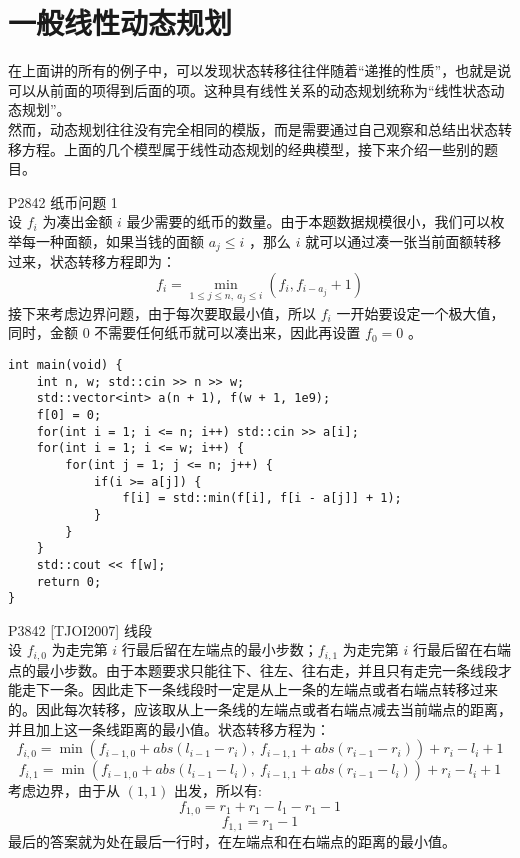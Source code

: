 \documentclass{beamer}
\begin{document}
\section{一般线性动态规划}
\begin{frame}
在上面讲的所有的例子中，可以发现状态转移往往伴随着“递推的性质”，也就是说可以从前面的项得到后面的项。这种具有线性关系的动态规划统称为“线性状态动态规划”。\\ 
然而，动态规划往往没有完全相同的模版，而是需要通过自己观察和总结出状态转移方程。上面的几个模型属于线性动态规划的经典模型，接下来介绍一些别的题目。
\end{frame}
\begin{frame}
P2842 纸币问题 1\\
设 $f_i$ 为凑出金额 $i$ 最少需要的纸币的数量。由于本题数据规模很小，我们可以枚举每一种面额，如果当钱的面额 $a_j \leq i$ ，那么 $i$ 就可以通过凑一张当前面额转移过来，状态转移方程即为：
$$f_i = \min_{1 \leq j \leq n, \ a_j \leq i}(f_i, f_{i - a_j} + 1)$$
接下来考虑边界问题，由于每次要取最小值，所以 $f_i$ 一开始要设定一个极大值，同时，金额 $0$ 不需要任何纸币就可以凑出来，因此再设置 $f_0 = 0$ 。
\end{frame}
\begin{frame}[fragile]
\begin{onlyenv}
\begin{verbatim}
int main(void) {
    int n, w; std::cin >> n >> w;
    std::vector<int> a(n + 1), f(w + 1, 1e9);
    f[0] = 0;
    for(int i = 1; i <= n; i++) std::cin >> a[i];
    for(int i = 1; i <= w; i++) {
        for(int j = 1; j <= n; j++) {
            if(i >= a[j]) {
                f[i] = std::min(f[i], f[i - a[j]] + 1);
            }
        }
    }
    std::cout << f[w];
    return 0;
}
\end{verbatim}
\end{onlyenv}
\end{frame}
\begin{frame}
P3842 [TJOI2007] 线段\\ 
设 $f_{i, 0}$ 为走完第 $i$ 行最后留在左端点的最小步数；$f_{i, 1}$ 为走完第 $i$ 行最后留在右端点的最小步数。由于本题要求只能往下、往左、往右走，并且只有走完一条线段才能走下一条。因此走下一条线段时一定是从上一条的左端点或者右端点转移过来的。因此每次转移，应该取从上一条线的左端点或者右端点减去当前端点的距离，并且加上这一条线距离的最小值。状态转移方程为：
$$f_{i, 0} = \min(f_{i - 1, 0} + abs(l_{i - 1} - r_i), \ f_{i - 1, 1} + abs(r_{i - 1} - r_i)) + r_i - l_i + 1 $$
$$f_{i, 1} = \min(f_{i - 1, 0} + abs(l_{i - 1} - l_i), \ f_{i - 1, 1} + abs(r_{i - 1} - l_i)) + r_i - l_i + 1 $$
考虑边界，由于从 $(1, 1)$ 出发，所以有:
$$f_{1, 0} = r_1 + r_1 - l_1 - r_1 - 1$$
$$f_{1, 1} = r_1 - 1$$
最后的答案就为处在最后一行时，在左端点和在右端点的距离的最小值。
\end{frame}
\end{document}
